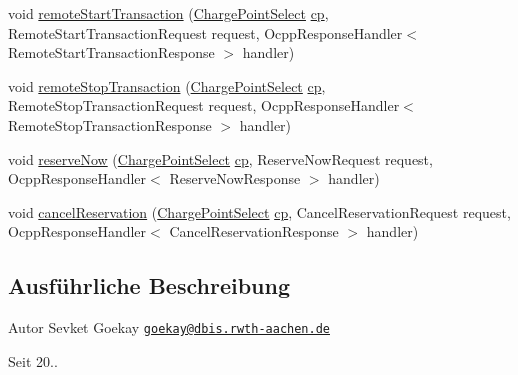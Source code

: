 \begin{DoxyCompactItemize}
\item 
void \hyperlink{interfacede_1_1rwth_1_1idsg_1_1steve_1_1ocpp_1_1_charge_point_service15___invoker_ab70a0f730ee43fe4123291d211e31271}{remote\+Start\+Transaction} (\hyperlink{classde_1_1rwth_1_1idsg_1_1steve_1_1repository_1_1dto_1_1_charge_point_select}{Charge\+Point\+Select} \hyperlink{get_transaction_ids_8js_a02fb69feb56940fd46d72ea6a60e511f}{cp}, Remote\+Start\+Transaction\+Request request, Ocpp\+Response\+Handler$<$ Remote\+Start\+Transaction\+Response $>$ handler)
\item 
void \hyperlink{interfacede_1_1rwth_1_1idsg_1_1steve_1_1ocpp_1_1_charge_point_service15___invoker_a50d840b72b8705214b4c5d9e235be133}{remote\+Stop\+Transaction} (\hyperlink{classde_1_1rwth_1_1idsg_1_1steve_1_1repository_1_1dto_1_1_charge_point_select}{Charge\+Point\+Select} \hyperlink{get_transaction_ids_8js_a02fb69feb56940fd46d72ea6a60e511f}{cp}, Remote\+Stop\+Transaction\+Request request, Ocpp\+Response\+Handler$<$ Remote\+Stop\+Transaction\+Response $>$ handler)
\item 
void \hyperlink{interfacede_1_1rwth_1_1idsg_1_1steve_1_1ocpp_1_1_charge_point_service15___invoker_ad550c0db63a3276b7103a6344bd18c22}{reserve\+Now} (\hyperlink{classde_1_1rwth_1_1idsg_1_1steve_1_1repository_1_1dto_1_1_charge_point_select}{Charge\+Point\+Select} \hyperlink{get_transaction_ids_8js_a02fb69feb56940fd46d72ea6a60e511f}{cp}, Reserve\+Now\+Request request, Ocpp\+Response\+Handler$<$ Reserve\+Now\+Response $>$ handler)
\item 
void \hyperlink{interfacede_1_1rwth_1_1idsg_1_1steve_1_1ocpp_1_1_charge_point_service15___invoker_ab430420546dd1a3147d04b619ef088e9}{cancel\+Reservation} (\hyperlink{classde_1_1rwth_1_1idsg_1_1steve_1_1repository_1_1dto_1_1_charge_point_select}{Charge\+Point\+Select} \hyperlink{get_transaction_ids_8js_a02fb69feb56940fd46d72ea6a60e511f}{cp}, Cancel\+Reservation\+Request request, Ocpp\+Response\+Handler$<$ Cancel\+Reservation\+Response $>$ handler)
\end{DoxyCompactItemize}


\subsection{Ausführliche Beschreibung}
\begin{DoxyAuthor}{Autor}
Sevket Goekay \href{mailto:goekay@dbis.rwth-aachen.de}{\tt goekay@dbis.\+rwth-\/aachen.\+de} 
\end{DoxyAuthor}
\begin{DoxySince}{Seit}
20.. 
\end{DoxySince}



